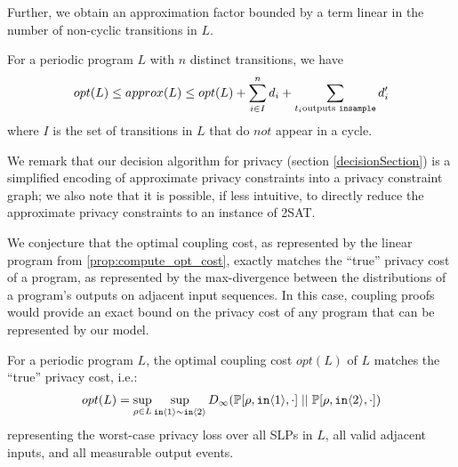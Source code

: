 Further, we obtain an approximation factor bounded by a term linear in the number of non-cyclic transitions in $L$. 

\begin{prop}
    \label{prop:approx_opt_are_close}
    For a periodic program $L$ with $n$ distinct transitions, we have 
    \[opt(L) \leq approx(L) \leq opt(L) + \sum_{i \in I }^n d_i + \sum_{t_i \text{outputs \texttt{insample}}} d_i'\]
    where $I$ is the set of transitions in $L$ that do $\textit{not}$ appear in a cycle.
\end{prop}

We remark that our decision algorithm for privacy (section \ref{decisionSection}) is a simplified encoding of approximate privacy constraints into a privacy constraint graph; we also note that it is possible, if less intuitive, to directly reduce the approximate privacy constraints to an instance of 2SAT. 

We conjecture that the optimal coupling cost, as represented by the linear program from \ref{prop:compute_opt_cost}, exactly matches the ``true'' privacy cost of a program, as represented by the max-divergence between the distributions of a program's outputs on adjacent input sequences. In this case, coupling proofs would provide an exact bound on the privacy cost of any program that can be represented by our model. 

\begin{conj}
    For a periodic program $L$, the optimal coupling cost $opt(L)$ of $L$ matches the ``true'' privacy cost, i.e.:
    \begin{align*}
        opt(L) = \sup_{\rho \in L} \sup_{\texttt{in}\langle1 \rangle \sim \texttt{in}\langle2 \rangle} D_\infty(\mathbb{P}[\rho, \texttt{in}\langle1 \rangle, \cdot]\; ||\; \mathbb{P}[\rho, \texttt{in}\langle2 \rangle, \cdot])
    \end{align*}
    representing the worst-case privacy loss over all SLPs in $L$, all valid adjacent inputs, and all measurable output events.
\end{conj}
